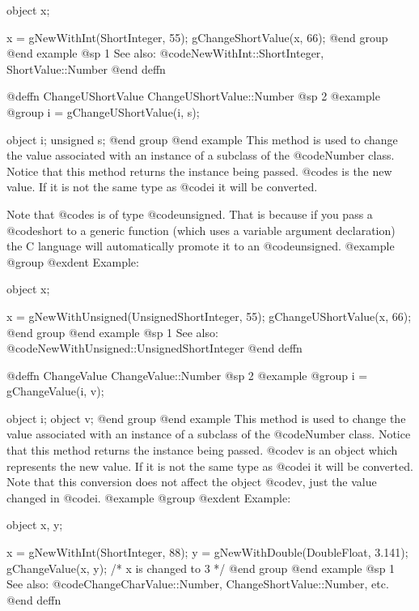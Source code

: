 object  x;

x = gNewWithInt(ShortInteger, 55);
gChangeShortValue(x, 66);
@end group
@end example
@sp 1
See also:  @code{NewWithInt::ShortInteger, ShortValue::Number}
@end deffn









@deffn {ChangeUShortValue} ChangeUShortValue::Number
@sp 2
@example
@group
i = gChangeUShortValue(i, s);

object  i;
unsigned  s;
@end group
@end example
This method is used to change the value associated with an instance of
a subclass of the @code{Number} class.  Notice that this method
returns the instance being passed.  @code{s} is the new value.
If it is not the same type as @code{i} it will be converted.

Note that @code{s} is of type @code{unsigned}.  That is because if you pass a
@code{short} to a generic function (which uses a variable argument
declaration) the C language will automatically promote it to an
@code{unsigned}.
@example
@group
@exdent Example:

object  x;

x = gNewWithUnsigned(UnsignedShortInteger, 55);
gChangeUShortValue(x, 66);
@end group
@end example
@sp 1
See also:  @code{NewWithUnsigned::UnsignedShortInteger}
@end deffn










@deffn {ChangeValue} ChangeValue::Number
@sp 2
@example
@group
i = gChangeValue(i, v);

object  i;
object  v;
@end group
@end example
This method is used to change the value associated with an instance of a
subclass of the @code{Number} class.  Notice that this method returns
the instance being passed.  @code{v} is an object which represents the
new value.  If it is not the same type as @code{i} it will be converted.
Note that this conversion does not affect the object @code{v}, just
the value changed in @code{i}.
@example
@group
@exdent Example:

object  x, y;

x = gNewWithInt(ShortInteger, 88);
y = gNewWithDouble(DoubleFloat, 3.141);
gChangeValue(x, y);    /*  x is changed to 3  */
@end group
@end example
@sp 1
See also:  @code{ChangeCharValue::Number, ChangeShortValue::Number, etc.}
@end deffn










